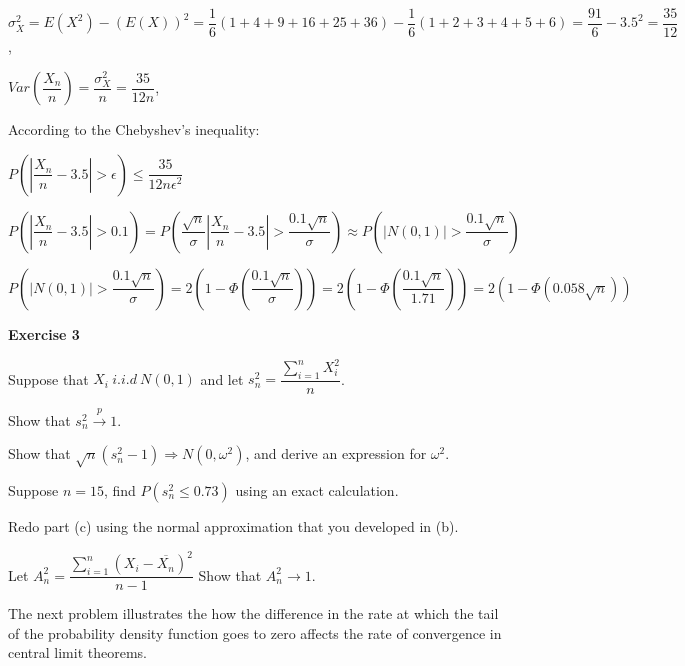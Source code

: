 \documentclass[12pt]{article}
\begin{document}
\begin{list}{()~}{}
\item 

$\sigma_{X}^2=E\left(X^2\right)-\left(E\left(X\right)\right)^2 = \dfrac{1}{6}\left(1 + 4 + 9 + 16 + 25 + 36\right)-\dfrac{1}{6}\left(1+2+3+4+5+6\right) = \dfrac{91}{6}-3.5^2 = \dfrac{35}{12}$,

$Var\left(\dfrac{X_n}{n}\right)=\dfrac{\sigma_{X}^2}{n} = \dfrac{35}{12n}$,

According to the Chebyshev's inequality:

$P\left(\left|\dfrac{X_n}{n}-3.5\right|>\epsilon\right)\leq\dfrac{35}{12n\epsilon^2}$

\item

$P\left(\left|\dfrac{X_n}{n}-3.5\right|> 0.1\right)=P\left(\dfrac{\sqrt{n}}{\sigma}\left|\dfrac{X_n}{n}-3.5\right|> \dfrac{0.1\sqrt{n}}{\sigma}\right)\approx P\left(\left|N\left(0,1\right)\right|>\dfrac{0.1\sqrt{n}}{\sigma}\right)$

$P\left(\left|N\left(0,1\right)\right|>\dfrac{0.1\sqrt{n}}{\sigma}\right) = 2\left(1-\Phi\left(\dfrac{0.1\sqrt{n}}{\sigma}\right)\right) = 2\left(1-\Phi\left(\dfrac{0.1\sqrt{n}}{1.71}\right)\right) = 2\left(1-\Phi\left(0.058\sqrt{n}\right)\right) $

\end{list}

\bigskip

\textbf{Exercise 3}

Suppose that $X_i ~ i.i.d\ N\left(0, 1\right)$ and let $s_n^2 = \dfrac{\sum_{i = 1}^n X_i^2}{n}$.

\begin{list}{()~}{}
\item 
Show that $s_n^2 \xrightarrow{p} 1$.

\item Show that $\sqrt{n}\left(s_n^2 - 1\right) \Rightarrow N \left(0, \omega^2 \right)$, and derive an expression for $\omega^2$.

\item Suppose $n = 15$, find $P\left(s_n^2 \leq 0.73\right)$ using an exact calculation.
\item Redo part (c) using the normal approximation that you developed in (b).
\item Let $A_n^2 = \dfrac{\sum_{i = 1}^n\left(X_i-\overline{X_n}\right)^2}{n-1}$
Show that $A_n^2 \rightarrow 1$.
\end{list}
The next problem illustrates the how the difference in the rate at which the tail of the probability density function goes to zero affects the rate of convergence in central limit theorems.
\medskip		
\end{document}
